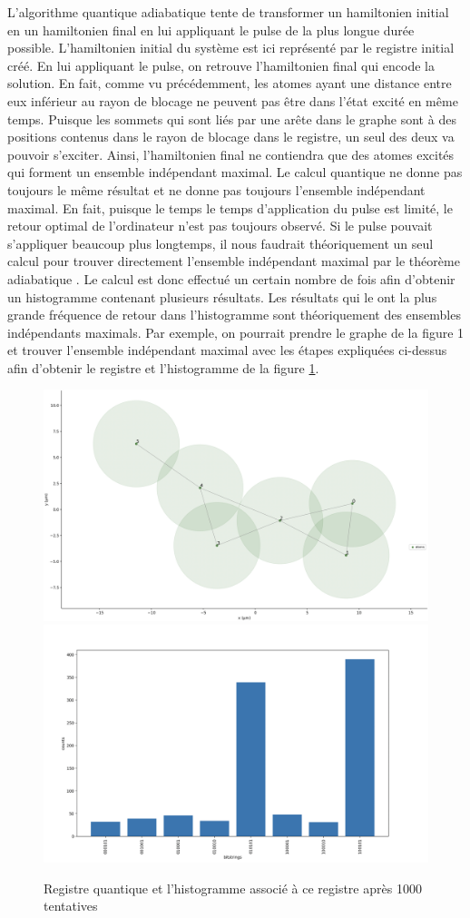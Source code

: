 \documentclass[11pt]{article}
\begin{document}
L'algorithme quantique adiabatique tente de transformer un hamiltonien initial en un hamiltonien final en lui appliquant le pulse de la plus longue durée possible. L'hamiltonien initial du système est ici représenté par le registre initial créé. En lui appliquant le pulse, on retrouve l'hamiltonien final qui encode la solution. En fait, comme vu précédemment, les atomes ayant une distance entre eux inférieur au rayon de blocage ne peuvent pas être dans l'état excité en même temps. Puisque les sommets qui sont liés par une arête dans le graphe sont à des positions contenus dans le rayon de blocage dans le registre, un seul des deux va pouvoir s'exciter. Ainsi, l'hamiltonien final ne contiendra que des atomes excités qui forment un ensemble indépendant maximal. Le calcul quantique ne donne pas toujours le même résultat et ne donne pas toujours l'ensemble indépendant maximal. En fait, puisque le temps le temps d'application du pulse est limité, le retour optimal de l'ordinateur n'est pas toujours observé. Si le pulse pouvait s'appliquer beaucoup plus longtemps, il nous faudrait théoriquement un seul calcul pour trouver directement l'ensemble indépendant maximal par le théorème adiabatique \cite{amin_consistency_2009}. Le calcul est donc effectué un certain nombre de fois afin d'obtenir un histogramme contenant plusieurs résultats. Les résultats qui  le ont la plus grande fréquence de retour dans l'histogramme sont théoriquement des ensembles indépendants maximals. Par exemple, on pourrait prendre le graphe de la figure 1 et trouver l'ensemble indépendant maximal avec les étapes expliquées ci-dessus afin d'obtenir le registre et l'histogramme de la figure \ref{QMIS_exemple}.
\begin{figure}[H]
    \centering
    \includegraphics[width = 0.48\linewidth]{images/registre_exemple.png}
    \includegraphics[width=0.49\linewidth]{images/histogram_exemple.png}
    \caption{Registre quantique et l'histogramme associé à ce registre après 1000 tentatives}
    \label{QMIS_exemple}
\end{figure}
    
\end{document}
